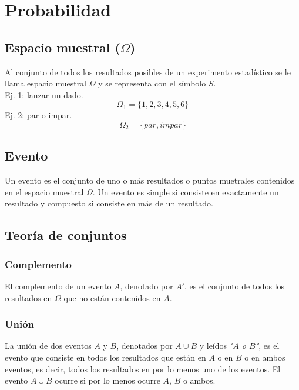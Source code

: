 \documentclass{report}
\begin{document}
  \chapter*{Probabilidad}
    
    \section*{Espacio muestral ($\Omega$)}
      Al conjunto de todos los resultados posibles de un experimento estadístico 
      se le llama espacio muestral $\Omega$ y se representa con el símbolo $S$.\\
      \indent Ej. 1: lanzar un dado.
      \begin{equation*}
        \Omega_1=\{1, 2, 3, 4, 5, 6\}
      \end{equation*}
      \indent Ej. 2: par o impar.
      \begin{equation*}
        \Omega_2=\{par, impar\}
      \end{equation*}
    \section*{Evento}
    Un evento es el conjunto de uno o más resultados o puntos muetrales 
    contenidos en el espacio muestral $\Omega$. Un evento es simple si 
    consiste en exactamente un resultado y compuesto si consiste en más 
    de un resultado.

    \section*{Teoría de conjuntos}

      \subsection*{Complemento}
      El complemento de un evento $A$, denotado por $A'$, es el conjunto de todos los 
      resultados en $\Omega$ que no están contenidos en $A$. 

      \subsection*{Unión}
      La unión de dos eventos $A$ y $B$, denotados por $A\cup B$ y leídos \textit{"$A$ o $B$"}, 
      es el evento que consiste en todos los resultados que están en $A$ o en $B$ 
      o en ambos eventos, es decir, todos  los resultados en por lo menos uno de 
      los eventos. El evento $A\cup B$ ocurre si por lo menos ocurre $A$, $B$ 
      o ambos.
\end{document}
